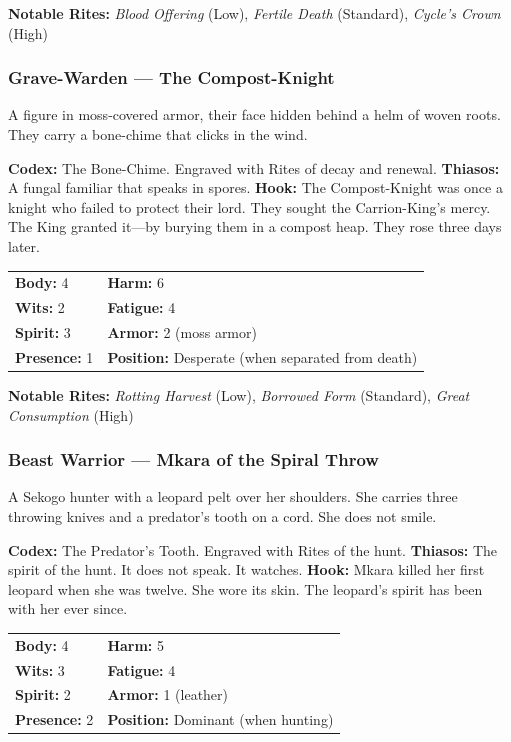 \textbf{Notable Rites:} \textit{Blood Offering} (Low), \textit{Fertile Death} (Standard), \textit{Cycle's Crown} (High)

\subsubsection{Grave-Warden — The Compost-Knight}

A figure in moss-covered armor, their face hidden behind a helm of woven roots. They carry a bone-chime that clicks in the wind.

\textbf{Codex:} The Bone-Chime. Engraved with Rites of decay and renewal.
\textbf{Thiasos:} A fungal familiar that speaks in spores.
\textbf{Hook:} The Compost-Knight was once a knight who failed to protect their lord. They sought the Carrion-King's mercy. The King granted it—by burying them in a compost heap. They rose three days later.

\begin{tabular}{ll}
\textbf{Body:} 4 & \textbf{Harm:} 6 \\
\textbf{Wits:} 2 & \textbf{Fatigue:} 4 \\
\textbf{Spirit:} 3 & \textbf{Armor:} 2 (moss armor) \\
\textbf{Presence:} 1 & \textbf{Position:} Desperate (when separated from death) \\
\end{tabular}

\textbf{Notable Rites:} \textit{Rotting Harvest} (Low), \textit{Borrowed Form} (Standard), \textit{Great Consumption} (High)

\subsubsection{Beast Warrior — Mkara of the Spiral Throw}

A Sekogo hunter with a leopard pelt over her shoulders. She carries three throwing knives and a predator's tooth on a cord. She does not smile.

\textbf{Codex:} The Predator's Tooth. Engraved with Rites of the hunt.
\textbf{Thiasos:} The spirit of the hunt. It does not speak. It watches.
\textbf{Hook:} Mkara killed her first leopard when she was twelve. She wore its skin. The leopard's spirit has been with her ever since.

\begin{tabular}{ll}
\textbf{Body:} 4 & \textbf{Harm:} 5 \\
\textbf{Wits:} 3 & \textbf{Fatigue:} 4 \\
\textbf{Spirit:} 2 & \textbf{Armor:} 1 (leather) \\
\textbf{Presence:} 2 & \textbf{Position:} Dominant (when hunting) \\
\end{tabular}

